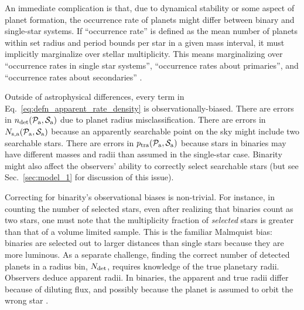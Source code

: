 \documentclass[12pt,modern]{aastex61}
\newcommand{\pp}{\mathcal{P}}
\newcommand{\ps}{\mathcal{S}}
\renewcommand{\a}{_{\rm a}}
\begin{document}
An immediate complication is that, due to dynamical stability or some 
aspect of planet formation, the occurrence rate of planets might differ 
between binary and single-star systems.
If ``occurrence rate'' is defined as the mean number of planets within 
set radius and period bounds per star in a given mass interval, it must 
implicitly marginalize over stellar multiplicity.
This means marginalizing over ``occurrence rates in single star systems'', 
``occurrence rates about primaries'', and
``occurrence rates about secondaries''
\citep[see][]{wang_occurrence_2015}.

Outside of astrophysical differences, every term in 
Eq.~\ref{eq:defn_apparent_rate_density} is observationally-biased.
There are errors in $n_{\rm det}(\pp\a,\ps\a)$ due to planet radius 
misclassification.
There are errors in $N_{{\rm s,a}}(\pp\a,\ps\a)$ because an apparently 
searchable point on the sky might include two searchable stars.
There are errors in $p_{\rm tra}(\pp\a,\ps\a)$ because stars in binaries may 
have different masses and radii than assumed in the single-star case.
Binarity might also affect the observers' ability to correctly select 
searchable stars (but see Sec.~\ref{sec:model_1} for discussion of this 
issue).

Correcting for binarity's observational biases is non-trivial.
For instance, in counting the number of selected stars, even after realizing 
that binaries count as two stars, one must note that the multiplicity fraction 
of {\it selected} stars is greater than that of a volume limited 
sample.
This is the familiar Malmquist bias: binaries are selected out to larger 
distances than single stars because they are more luminous.
As a separate challenge, finding the correct number of detected planets in a 
radius bin, $N_{\rm det}$, requires knowledge of the true planetary radii.
Observers deduce apparent radii.
In binaries, the apparent and true radii differ because of diluting flux, 
and possibly because the planet is assumed to orbit the wrong star
\citep[\textit{e.g.},][]{furlan_kepler_2017}.
\end{document}
